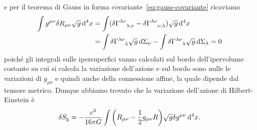 e per il teorema di Gauss in forma covariante~\eqref{eq:gauss-covariante}
ricaviamo
\begin{equation}
  \begin{split}
    \int g^{\mu\nu} \delta R_{\mu\nu} \sqrt{g} \dd^{4} x &= \int (\delta
    \tensor{\Gamma}{^{\lambda\nu}_{\lambda;\nu}} - \delta
    \tensor{\Gamma}{^{\lambda\nu}_{\nu;\lambda}}) \sqrt{g} \dd^{4} x \\
    &= \int \delta \tensor{\Gamma}{^{\lambda\nu}_{\lambda}} \sqrt{g} \dd
    \Sigma_{\nu} - \int \delta \tensor{\Gamma}{^{\lambda\nu}_{\lambda}} \sqrt{g}
    \dd \Sigma_{\lambda} = 0
  \end{split}
\end{equation}
poiché gli integrali sulle ipersuperfici vanno calcolati sul bordo
dell'ipervolume costante su cui si calcola la variazione dell'azione e sul bordo
sono nulle le variazioni di $g_{\mu\nu}$ e quindi anche della connessione
affine, la quale dipende dal tensore metrico.  Dunque abbiamo trovato che la
variazione dell'azione di Hilbert-Einstein è
\begin{equation}
  \delta S_{\textup{g}} = -\frac{c^{3}}{16\pi G} \int \bigg( R_{\mu\nu} -
  \frac{1}{2} g_{\mu\nu} R \bigg)\sqrt{g} \delta g^{\mu\nu} \mathop{}\!\mathrm{d}^{4} x.
\end{equation}

